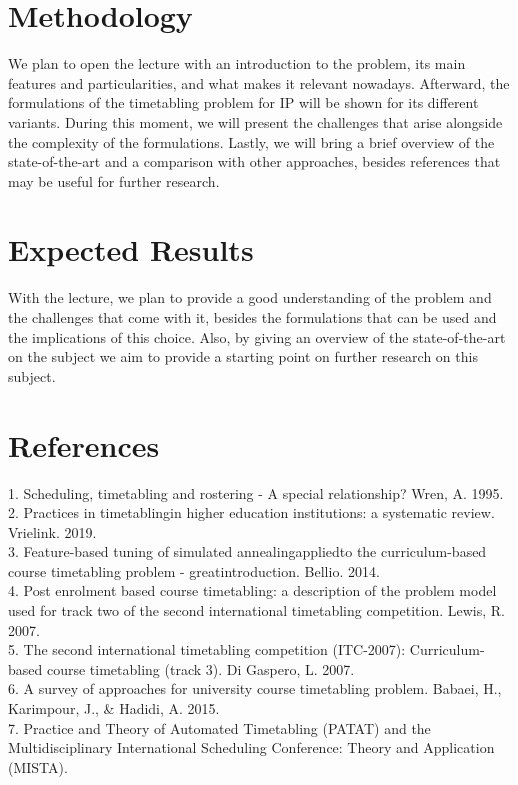 \documentclass[a4paper]{report}
\begin{document}
\section*{Methodology}

We plan to open the lecture with an introduction to the problem, its main features and particularities, and what makes it relevant nowadays. Afterward, the formulations of the timetabling problem for IP will be shown for its different variants. During this moment, we will present the challenges that arise alongside the complexity of the formulations. Lastly, we will bring a brief overview of the state-of-the-art and a comparison with other approaches, besides references that may be useful for further research.

\section*{Expected Results}

With the lecture, we plan to provide a good understanding of the problem and the challenges that come with it, besides the formulations that can be used and the implications of this choice. Also, by giving an overview of the state-of-the-art on the subject we aim to provide a starting point on further research on this subject.

\section*{References}

1. Scheduling, timetabling and rostering - A special relationship? Wren, A. 1995. \\
2. Practices in timetablingin higher education institutions: a systematic review. Vrielink. 2019. \\
3. Feature-based tuning of simulated annealingappliedto the curriculum-based course timetabling problem - greatintroduction. Bellio. 2014. \\
4. Post enrolment based course timetabling: a description of the problem model used for track two of the second international timetabling competition. Lewis, R. 2007. \\
5. The second international timetabling competition (ITC-2007): Curriculum-based course timetabling (track 3). Di Gaspero, L. 2007. \\
6. A survey of approaches for university course timetabling problem. Babaei, H., Karimpour, J., \& Hadidi, A. 2015. \\
7. Practice and Theory of Automated Timetabling (PATAT) and the Multidisciplinary International Scheduling Conference: Theory and Application (MISTA). \\
\end{document}
